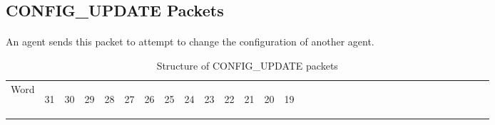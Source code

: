 \documentclass[11pt]{article}
\begin{document}
\subsection {CONFIG\_UPDATE Packets}
\paragraph{}
An agent sends this packet to attempt to change the configuration of another agent.
\newline
\begin{table}[h!]
    \centering
    \label{tab:configUpdateDef}
    \caption{Structure of CONFIG\_UPDATE packets}
    \begin{tabular}{|p{1cm}|m{0.04cm}|m{0.04cm}|m{0.04cm}|m{0.04cm}|m{0.04cm}|m{0.04cm}|m{0.04cm}|m{0.04cm}|m{0.04cm}|
        m{0.04cm}|m{0.04cm}|m{0.04cm}|m{0.04cm}|m{0.04cm}|m{0.04cm}|m{0.04cm}|m{0.04cm}|m{0.04cm}|m{0.04cm}|m{0.04cm}|
        m{0.04cm}|m{0.04cm}|m{0.04cm}|m{0.04cm}|m{0.04cm}|m{0.04cm}|m{0.04cm}|m{0.04cm}|m{0.04cm}|m{0.04cm}|m{0.04cm}|m{0.04cm}|}
        \hline
        Word & 
        \begin{sideways}31\end{sideways} &
        \begin{sideways}30\end{sideways} & 
        \begin{sideways}29\end{sideways} &
        \begin{sideways}28\end{sideways} &
        \begin{sideways}27\end{sideways} &
        \begin{sideways}26\end{sideways} &
        \begin{sideways}25\end{sideways} &
        \begin{sideways}24\end{sideways} &
        \begin{sideways}23\end{sideways} &
        \begin{sideways}22\end{sideways} &
        \begin{sideways}21\end{sideways} &
        \begin{sideways}20\end{sideways} &
        \begin{sideways}19\end{sideways} &

\end{tabular}
\end{table}
\end{document}

